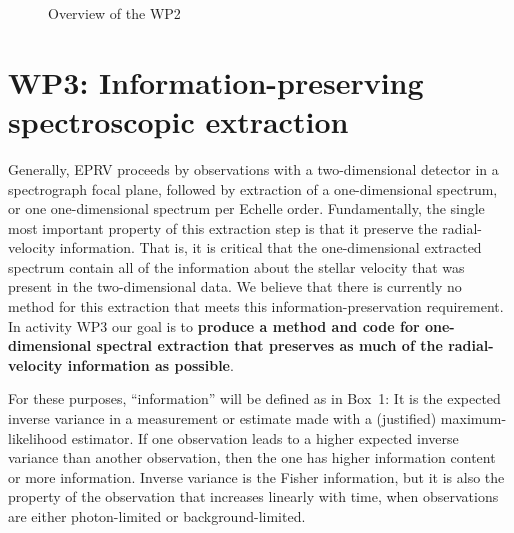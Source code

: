 \documentclass[12pt]{article}
\begin{document}
\begin{figure}[p!]
        \caption{Overview of the WP2}
    \end{figure}

\section{WP3: Information-preserving spectroscopic extraction}

Generally, EPRV proceeds by observations with a two-dimensional detector in a spectrograph focal plane, followed by extraction of a one-dimensional spectrum, or one one-dimensional spectrum per Echelle order.
Fundamentally, the single most important property of this extraction step is that it preserve the radial-velocity information.
That is, it is critical that the one-dimensional extracted spectrum contain all of the information about the stellar velocity that was present in the two-dimensional data.
We believe that there is currently no method for this extraction that meets this information-preservation requirement.
In activity WP3 our goal is to \textbf{produce a method and code for one-dimensional spectral extraction that preserves as much of the radial-velocity information as possible}.

For these purposes, ``information'' will be defined as in Box~1: It is the expected inverse variance in a measurement or estimate made with a (justified) maximum-likelihood estimator.
If one observation leads to a higher expected inverse variance than another observation, then the one has higher information content or more information.
Inverse variance is the Fisher information, but it is also the property of the observation that increases linearly with time, when observations are either photon-limited or background-limited.
\end{document}
